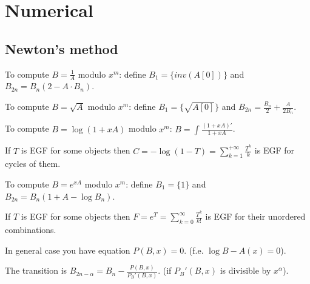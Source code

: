 \chapter{Numerical}
\section{Newton's method}
	To compute $B = \frac{1}{A}$ modulo $x^m$: define $B_1 = \{inv(A[0])\}$ and $B_{2n} = B_n (2 - A \cdot B_n)$.


	To compute $B = \sqrt{A}$ modulo $x^m$: define $B_1 = \{\sqrt{A[0]}\}$ and $B_{2n} = \frac{B_n}{2} + \frac{A}{2B_n}$.


	To compute $B = \log (1 + xA)$ modulo $x^m$: $B = \int\frac{(1 + xA)'}{1 + xA}$.

	If $T$ is EGF for some objects then $C = -\log (1 - T) = \sum_{k = 1}^{+\infty} \frac{T^k}{k}$ is EGF for cycles of them.


	To compute $B = e^{xA}$ modulo $x^m$: define $B_1 = \{1\}$ and $B_{2n} = B_n(1 + A - \log B_n)$.

	If $T$ is EGF for some objects then $F = e^T = \sum_{k = 0}^{\infty} \frac{T^k}{k!}$ is EGF for their unordered combinations.

	In general case you have equation $P(B, x) = 0$. (f.e. $\log B - A(x) = 0$).

	The transition is $B_{2n - \alpha} = B_n - \frac{P(B, x)}{P_B'(B, x)}$. (if $P_B'(B, x)$ is divisible by $x^\alpha$).


